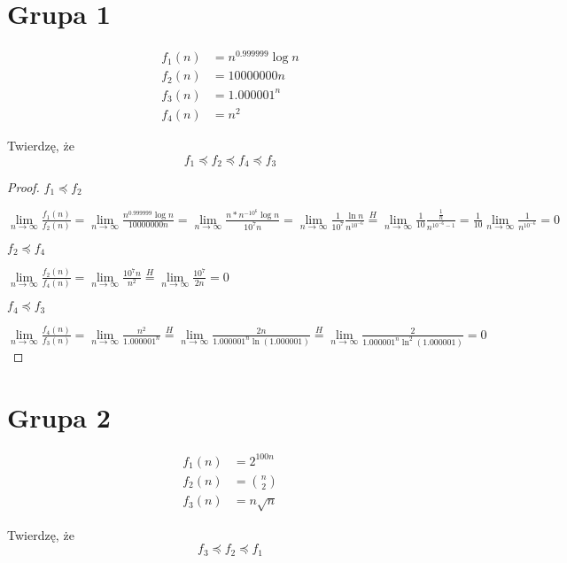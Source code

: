 \documentclass[50pt]{mwart}
\begin{document}
\section{Grupa 1}
\begin{align*}
f_1(n) &= n^{0.999999}\log n\\ 
 f_2(n) &= 10000000n \\
 f_3(n) &= 1.000001^n\\
 f_4(n) &= n^2 
\end{align*}
		

Twierdzę, że
$$ f_1\preccurlyeq f_2\preccurlyeq f_4 \preccurlyeq f_3$$

\begin{proof}

$f_1\preccurlyeq f_2$

\noindent$ \lim\limits_{n\to\infty} \frac{f_1(n)}{f_2(n)} = \lim\limits_{n\to\infty} \frac{n^{0.999999}\log n}{10000000n} = \lim\limits_{n\to\infty} \frac{ n*n^{-10^6}\log n}{10^7n} = \lim\limits_{n\to\infty} \frac{1}{10^7} \frac{\ln n}{n^{10^{-6}}} \overset{H}{=} \lim\limits_{n\to\infty} \frac{1}{10} \frac{\frac{1}{n}}{n^{10^{-6}-1}}= \frac{1}{10} \lim\limits_{n\to\infty} \frac{1}{n^{10^{-6}}}=0 $\newline

$f_2\preccurlyeq f_4$

\noindent$ \lim\limits_{n\to\infty} \frac{f_2(n)}{f_4(n)} =  \lim\limits_{n\to\infty} \frac{10^7n}{n^2} \overset{H}{=} \lim\limits_{n\to\infty} \frac{10^7}{2n} = 0$\newline


$f_4\preccurlyeq f_3$

\noindent$ \lim\limits_{n\to\infty} \frac{f_4(n)}{f_3(n)} = \lim\limits_{n\to\infty} \frac{n^2}{1.000001^n} \overset{H}{=} \lim\limits_{n\to\infty} \frac{2n}{1.000001^n\ln(1.000001)} \overset{H}{=} \lim\limits_{n\to\infty} \frac{2}{1.000001^n\ln^2(1.000001)} = 0$\newline
\end{proof}

\section{Grupa 2}
\begin{align*}
f_1(n) &= 2^{100n}\\
f_2(n) &= {n\choose2}\\
 f_3(n) &= n\sqrt n
\end{align*}

Twierdzę, że
$$ f_3\preccurlyeq f_2 \preccurlyeq f_1$$
\end{document}
